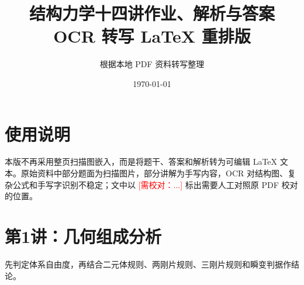 \documentclass[UTF8,12pt,a4paper,openany]{ctexbook}
\title{结构力学十四讲作业、解析与答案\\\large OCR 转写 LaTeX 重排版}
\author{根据本地 PDF 资料转写整理}
\date{\today}
\newcommand{\TODO}[1]{\textcolor{red}{[需校对：#1]}}
\begin{document}
\maketitle
\frontmatter
\chapter*{使用说明}
本版不再采用整页扫描图嵌入，而是将题干、答案和解析转为可编辑 LaTeX 文本。原始资料中部分题面为扫描图片，部分讲解为手写内容，OCR 对结构图、复杂公式和手写字识别不稳定；文中以 \TODO{...} 标出需要人工对照原 PDF 校对的位置。
\tableofcontents
\mainmatter
\chapter{第1讲：几何组成分析}
\begin{tcolorbox}[title=解析总览]
先判定体系自由度，再结合二元体规则、两刚片规则、三刚片规则和瞬变判据作结论。
\end{tcolorbox}
\end{document}
